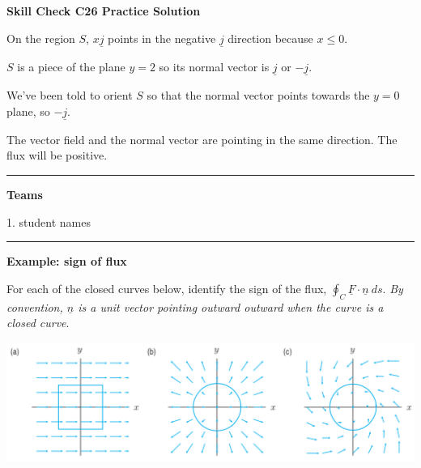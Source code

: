 \documentclass[12pt,letterpaper,noanswers]{exam}
\newcommand{\mb}[1]{\underline{#1}}
\begin{document}
\noindent\textbf{Skill Check C26 Practice Solution}

On the region $S$, $x\mb j$ points in the negative $\mb j$ direction because $x \leq 0$.

$S$ is a piece of the plane $y = 2$ so its normal vector is $\mb j$ or $-\mb j$.

We've been told to orient $S$ so that the normal vector points towards the $y = 0$ plane, so $-\mb j$.

The vector field and the normal vector are pointing in the same direction.  The flux will be positive.

\vspace{0.2cm}
\hrule
\vspace{0.2cm}

\noindent\textbf{Teams}
\begin{multicols}{2}

1.  student names
\end{multicols}
\vspace{0.2cm}
\hrule
\vspace{0.2cm}
\noindent\textbf{Example: sign of flux}

For each of the closed curves below, identify the sign of the flux, $\oint_C \mb F\cdot \mb n\ ds$.  \emph{By convention, $\mb n$ is a unit vector pointing outward outward when the curve is a closed curve}.

\includegraphics[scale=0.8]{img/C24p1.png}

\vspace{0.5in}
\end{document}

